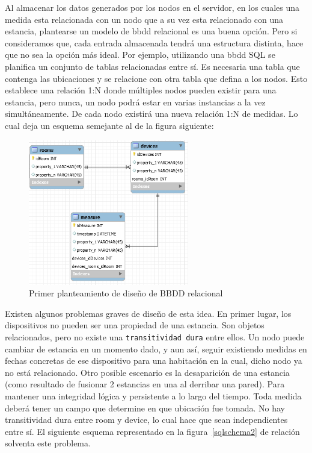 Al almacenar los datos generados por los nodos en el servidor, en los cuales una medida esta relacionada con un nodo que a su vez esta relacionado con una estancia, plantearse un modelo de \gls{bbdd} relacional es una buena opción. Pero si consideramos que, cada entrada almacenada tendrá una estructura distinta, hace que no sea la opción más ideal. Por ejemplo, utilizando una \gls{bbdd} SQL se planifica un conjunto de tablas relacionadas entre sí. Es necesaria una tabla que contenga las ubicaciones y se relacione con otra tabla que defina a los nodos. Esto establece una relación 1:N donde múltiples nodos pueden existir para una estancia, pero nunca, un nodo podrá estar en varias instancias a la vez simultáneamente. De cada nodo existirá una nueva relación 1:N de medidas. Lo cual deja un esquema semejante al de la figura siguiente:

\begin{figure}[hbt!]
\centering
\label{sqlschema1}
\includegraphics[height=2.5in]{figures/SQLSchemaExample_1.png}
\caption[Primer planteamiento de diseño de BBDD relacional]{Primer planteamiento de diseño de BBDD relacional\footnotemark}
\end{figure}

\vspace{1cm}

Existen algunos problemas graves de diseño de esta idea. En primer lugar, los dispositivos no pueden ser una propiedad de una estancia. Son objetos relacionados, pero no existe una \verb|transitividad dura| entre ellos. Un nodo puede cambiar de estancia en un momento dado, y aun así, seguir existiendo medidas en fechas concretas de ese dispositivo para una habitación en la cual, dicho nodo ya no está relacionado. Otro posible escenario es la desaparición de una estancia (como resultado de fusionar 2 estancias en una al derribar una pared). Para mantener una integridad lógica y persistente a lo largo del tiempo. Toda medida deberá tener un campo que determine en que ubicación fue tomada. No hay transitividad dura entre room y device, lo cual hace que sean independientes entre sí. El siguiente esquema representado en la figura~\ref{sqlschema2} de relación solventa este problema.


